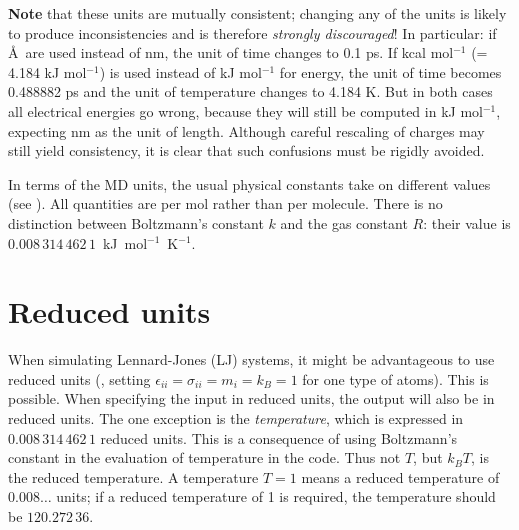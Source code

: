 {\bf Note} that these units are mutually consistent; changing any of the
units is likely to produce inconsistencies and is therefore {\em
strongly discouraged\/}! In particular: if \AA \ are used instead of
nm, the unit of time changes to 0.1 ps. If kcal mol$^{-1}$ (= 4.184
kJ mol$^{-1}$) is used instead of kJ mol$^{-1}$ for energy, the unit of time becomes
0.488882 ps and the unit of temperature changes to 4.184 K. But in
both cases all electrical energies go wrong, because they will still
be computed in kJ mol$^{-1}$, expecting nm as the unit of length. Although
careful rescaling of charges may still yield consistency, it is clear
that such confusions must be rigidly avoided.
  
In terms of the MD units, the usual physical constants take on
different values (see ). All quantities are per mol rather than per
molecule. There is no distinction between Boltzmann's constant $k$ and
the gas constant $R$: their value is
$0.008\,314\,462\,1$~kJ~mol$^{-1}$~K$^{-1}$.

\section{Reduced units}
When simulating Lennard-Jones (LJ) systems, it might be advantageous to
use reduced units ({\ie}, setting
$\epsilon_{ii}=\sigma_{ii}=m_i=k_B=1$ for one type of atoms). This is
possible. When specifying the input in reduced units, the output will
also be in reduced units. The one exception is the {\em
temperature}, which is expressed in $0.008\,314\,462\,1$ reduced
units. This is a consequence of using Boltzmann's constant in the
evaluation of temperature in the code. Thus not $T$, but $k_BT$, is the
reduced temperature. A {\gromacs} temperature $T=1$ means a reduced
temperature of $0.008\ldots$ units; if a reduced temperature of 1 is
required, the {\gromacs} temperature should be $120.272\,36$.

